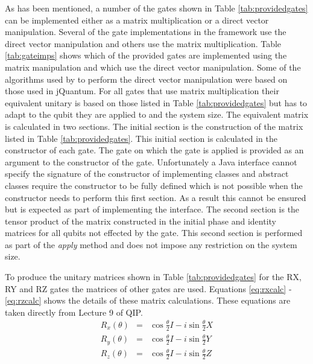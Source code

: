 As has been mentioned, a number of the gates shown in Table \ref{tab:providedgates} can be implemented either as a matrix multiplication or a direct vector manipulation.
Several of the gate implementations in the framework use the direct vector manipulation and others use the matrix multiplication.
Table \ref{tab:gateimps} shows which of the provided gates are implemented using the matrix manipulation and which use the direct vector manipulation.
Some of the algorithms used by to perform the direct vector manipulation were based on those used in jQuantum\cite{jquantum}.
For all gates that use matrix multiplication their equivalent unitary is based on those listed in Table \ref{tab:providedgates} but has to adapt to the qubit they are applied to and the system size.
The equivalent matrix is calculated in two sections.
The initial section is the construction of the matrix listed in Table \ref{tab:providedgates}.
This initial section is calculated in the constructor of each gate.
The gate on which the gate is applied is provided as an argument to the constructor of the gate.
Unfortunately a Java interface cannot specify the signature of the constructor of implementing classes and abstract classes require the constructor to be fully defined which is not possible when the constructor needs to perform this first section.
As a result this cannot be ensured but is expected as part of implementing the interface.
The second section is the tensor product of the matrix constructed in the initial phase and identity matrices for all qubits not effected by the gate.
This second section is performed as part of the \emph{apply} method and does not impose any restriction on the system size.

To produce the unitary matrices shown in Table \ref{tab:providedgates} for the RX, RY and RZ gates the matrices of other gates are used.
Equations \ref{eq:rxcalc} - \ref{eq:rzcalc} shows the details of these matrix calculations.
These equations are taken directly from Lecture 9 of QIP\cite{QIPLect}.
\begin{eqnarray}
\label{eq:rxcalc}
 R_x(\theta)&=&\cos{\frac{\theta}{2}}I-i\sin{\frac{\theta}{2}}X \\
\label{eq:rycalc}
 R_y(\theta)&=&\cos{\frac{\theta}{2}}I-i\sin{\frac{\theta}{2}}Y \\
\label{eq:rzcalc}
 R_z(\theta)&=&\cos{\frac{\theta}{2}}I-i\sin{\frac{\theta}{2}}Z 
\end{eqnarray}

